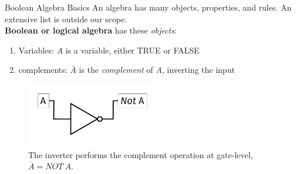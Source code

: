 \documentclass{beamer}
\begin{document}
\begin{frame}{Boolean Algebra Basics}
\small
An algebra has many objects, properties, and rules.  An extensive list is outside our scope.  \\ \vspace{0.1cm}
\textbf{Boolean or logical algebra} has these \textit{objects}: \\ \vspace{0.1cm}
\begin{enumerate}
\item Variables: $A$ is a variable, either TRUE or FALSE
\item complements: $\overline{A}$ is the \textit{complement} of $A$, inverting the input \\ \vspace{0.1cm}
\end{enumerate}
\begin{figure}
\centering
\includegraphics[width=0.5\textwidth]{figures/NOTOperation.pdf}
\caption{\label{fig:NOT} The inverter performs the complement operation at gate-level, $\overline{A} = NOT~A$.}
\end{figure}
\end{frame}
\end{document}
